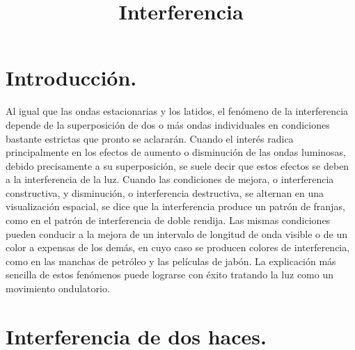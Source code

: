 \documentclass[14pt]{extarticle}
\title{\vspace*{-2cm} Interferencia}
\date{ }
\begin{document}
\maketitle

\section{Introducción.}

Al igual que las ondas estacionarias y los latidos, el fenómeno de la interferencia depende de la superposición de dos o más ondas individuales en condiciones bastante estrictas que pronto se aclararán. Cuando el interés radica principalmente en los efectos de aumento o disminución de las ondas luminosas, debido precisamente a su superposición, se suele decir que estos efectos se deben a la interferencia de la luz. Cuando las condiciones de mejora, o interferencia constructiva, y disminución, o interferencia destructiva, se alternan en una visualización espacial, se dice que la interferencia produce un patrón de franjas, como en el patrón de interferencia de doble rendija. Las mismas condiciones pueden conducir a la mejora de un intervalo de longitud de onda visible o de un color a expensas de los demás, en cuyo caso se producen colores de interferencia, como en las manchas de petróleo y las películas de jabón. La explicación más sencilla de estos fenómenos puede lograrse con éxito tratando la luz como un movimiento ondulatorio. %

\section{Interferencia de dos haces.}
\end{document}
